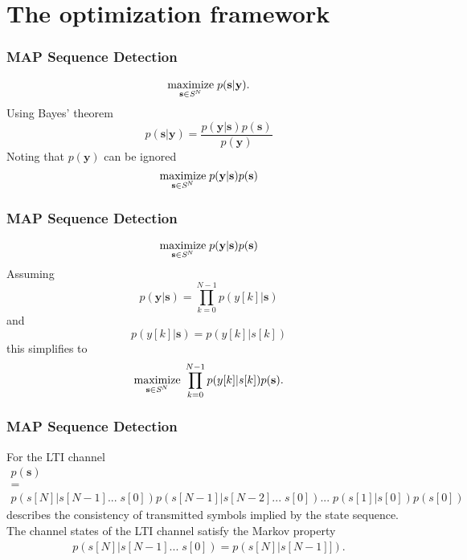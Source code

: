 \documentclass[10pt,tgadventor, onlymath]{beamer}
\begin{document}
\section{The optimization framework}

\begin{frame}
\frametitle{MAP Sequence Detection}
\begin{equation*}
\underset{\mathbf{s}\in\textit{\cal{S}}^N}{\text{maximize}} \; p(\mathbf{s}|\mathbf{y}).
\end{equation*} 
\pause
Using Bayes' theorem
\begin{equation*}
p(\mathbf{s}|\mathbf{y}) = 
\frac
{p(\mathbf{y}|\mathbf{s})p(\mathbf{s})}
{p(\mathbf{y})}
\end{equation*} 
Noting that $p(\mathbf{y})$ can be ignored 
\pause
\begin{equation}\label{opt_problem}
\underset{\mathbf{s}\in\textit{\cal{S}}^N}{\text{maximize}}\; p(\mathbf{y}|\mathbf{s})p(\mathbf{s})
\end{equation}

\end{frame}

\begin{frame}
\frametitle{MAP Sequence Detection}
\begin{equation*}\label{opt_problem}
\underset{\mathbf{s}\in\textit{\cal{S}}^N}{\text{maximize}}\; p(\mathbf{y}|\mathbf{s})p(\mathbf{s})
\end{equation*}
\pause
Assuming 
\begin{equation*}
p(\mathbf{y}|\mathbf{s}) = \prod_{k=0}^{N-1} p(y[k]|\mathbf{s})
\end{equation*}
\pause
and 
\begin{equation*}
p(y[k]|\mathbf{s}) = p(y[k]|s[k])
\end{equation*}
\pause
this simplifies to 
\begin{equation*}\label{opt_problem}
\underset{\mathbf{s}\in\textit{\cal{S}}^N}{\text{maximize}}\; \prod_{k=0}^{N-1} p(y[k]|s[k])p(\mathbf{s}).
\end{equation*}
\end{frame}

\begin{frame}
\frametitle{MAP Sequence Detection}
For the LTI channel
\begin{gather*}
p(\mathbf{s}) \\=\\
 p(s[N]| s[N-1]... \; s[0]) p(s[N-1]| s[N-2]... \; s[0])... \; p(s[1]| s[0])p(s[0])
\end{gather*}
describes the consistency of transmitted symbols implied by the state sequence.
The channel states of the LTI channel satisfy the Markov property 
\begin{gather*}
 p(s[N]| s[N-1]... \; s[0]) =  p(s[N]| s[N-1]]).
\end{gather*}

\end{frame}
\end{document}
